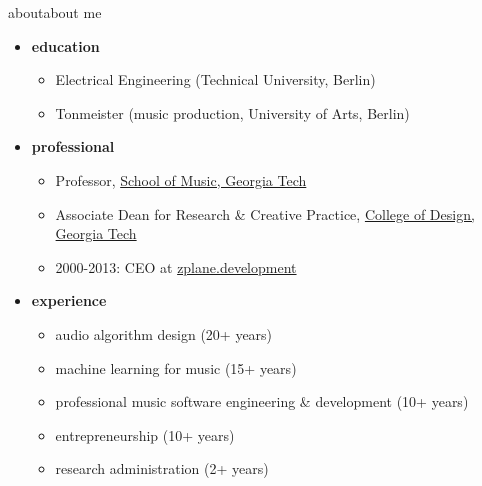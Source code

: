 \begin{frame}{about}{about me}
    \begin{itemize}
        \item   \textbf{education}
            \begin{itemize}
                \item   Electrical Engineering (Technical University, Berlin)
                \item   Tonmeister (music production, University of Arts, Berlin)
            \end{itemize}
        \bigskip
        \item   \textbf{professional}
            \begin{itemize}
                \item   Professor, \href{https://music.gatech.edu}{School of Music, Georgia Tech}
                \item   Associate Dean for Research \& Creative Practice, \href{https://design.gatech.edu}{College of Design, Georgia Tech}
                \item   2000-2013: CEO at \href{https://www.zplane.de}{zplane.development}
            \end{itemize}
        \bigskip
        \item   \textbf{experience}
            \begin{itemize}
                \item   audio algorithm design (20+ years)
                \item   machine learning for music (15+ years)
                \item   professional music software engineering \& development (10+ years)
                \item   entrepreneurship (10+ years)
                \item   research administration (2+ years)
            \end{itemize}
    \end{itemize}
    
\end{frame}
